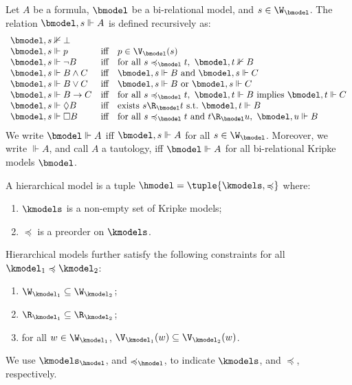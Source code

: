 \begin{definition}\label{def:bsat}
  Let $A$ be a formula, $\bmodel$ be a bi-relational model, and $s \in \W_{\bmodel}$.
  The relation $\bmodel, s \Vdash A$ is defined recursively as:
  \[\begin{array}{lcl}
      \bmodel, s \nVdash \bot \\%
      \bmodel, s \Vdash p & \text{iff} & p \in \V_{\bmodel}(s) \\
      \bmodel, s \Vdash \lnot B & \text{iff} & \text{for all } s \preccurlyeq_{\bmodel} t,~ \bmodel, t \nVdash B \\
      \bmodel, s \Vdash B \land C & \text{iff} & \bmodel, s \Vdash B \text{ and } \bmodel, s \Vdash C \\
      \bmodel, s \Vdash B \lor C & \text{iff} & \bmodel, s \Vdash B \text{ or } \bmodel, s \Vdash C \\
      \bmodel, s \Vdash B \to C & \text{iff} & \text{for all } s \preccurlyeq_{\bmodel} t,~ \bmodel, t \Vdash B \text{ implies } \bmodel, t \Vdash C \\
      \bmodel, s \Vdash \Diamond B & \text{iff} & \text{exists } s \R_{\bmodel} t \text{ s.t.\ } \bmodel, t \Vdash B \\
      \bmodel, s \Vdash \Box B & \text{iff} & \text{for all } s \preccurlyeq_{\bmodel} t \text{ and } t \R_{\bmodel} u,~ \bmodel, u \Vdash B
  \end{array}\]
  We write $\bmodel \Vdash A$ iff $\bmodel, s \Vdash A$ for all $s \in \W_{\bmodel}$.
  Moreover, we write $\Vdash A$, and call $A$ a tautology, iff $\bmodel \Vdash A$ for all bi-relational Kripke models $\bmodel$.
\end{definition}

\begin{definition}\label{def:imodel}
  A hierarchical model is a tuple $\hmodel = \tuple{\kmodels, \preccurlyeq}$ where:
  \begin{enumerate}
    \setlength{\itemsep}{0pt}
    \item $\kmodels$ is a non-empty set of Kripke models;
    \item $\preccurlyeq$ is a preorder on $\kmodels$.
  \end{enumerate}
  Hierarchical models further satisfy the following constraints for all $\kmodel_1 \preccurlyeq \kmodel_2$:
  \begin{enumerate}[label=(\alph*)]
    \setlength{\itemsep}{0pt}
    \item ${\W_{\kmodel_1} \subseteq \W_{\kmodel_2}}$;
    \item ${\R_{\kmodel_1} \subseteq \R_{\kmodel_2}}$;
    \item for all $w \in \W_{\kmodel_1}$, $\V_{\kmodel_1}(w) \subseteq \V_{\kmodel_2}(w)$.
  \end{enumerate}
  We use $\kmodels_{\hmodel}$, and $\preccurlyeq_{\hmodel}$, to indicate $\kmodels$, and $\preccurlyeq$, respectively.
\end{definition}

